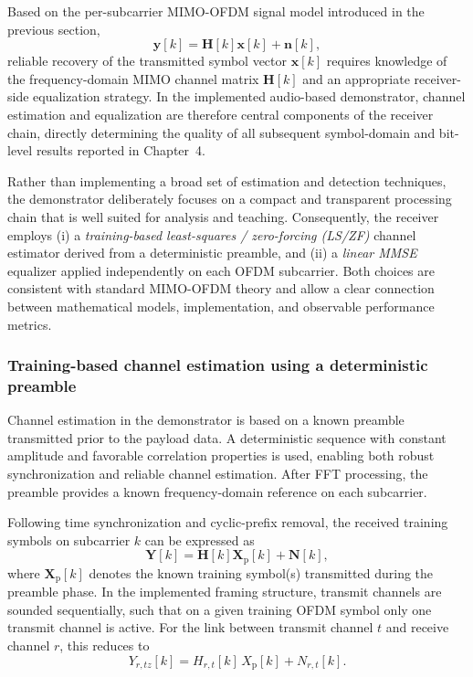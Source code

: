 Based on the per-subcarrier MIMO-OFDM signal model introduced in the previous section,
\begin{equation}
\mathbf{y}[k] = \mathbf{H}[k]\mathbf{x}[k] + \mathbf{n}[k],
\end{equation}
reliable recovery of the transmitted symbol vector $\mathbf{x}[k]$ requires knowledge of the frequency-domain MIMO channel matrix $\mathbf{H}[k]$ and an appropriate receiver-side equalization strategy. In the implemented audio-based demonstrator, channel estimation and equalization are therefore central components of the receiver chain, directly determining the quality of all subsequent symbol-domain and bit-level results reported in Chapter~4.

Rather than implementing a broad set of estimation and detection techniques, the demonstrator deliberately focuses on a compact and transparent processing chain that is well suited for analysis and teaching. Consequently, the receiver employs (i) a \emph{training-based least-squares / zero-forcing (LS/ZF)} channel estimator derived from a deterministic preamble, and (ii) a \emph{linear MMSE} equalizer applied independently on each OFDM subcarrier. Both choices are consistent with standard MIMO-OFDM theory and allow a clear connection between mathematical models, implementation, and observable performance metrics.

\subsubsection{Training-based channel estimation using a deterministic preamble}

Channel estimation in the demonstrator is based on a known preamble transmitted prior to the payload data. A deterministic sequence with constant amplitude and favorable correlation properties is used, enabling both robust synchronization and reliable channel estimation. After FFT processing, the preamble provides a known frequency-domain reference on each subcarrier.

Following time synchronization and cyclic-prefix removal, the received training symbols on subcarrier $k$ can be expressed as
\begin{equation}
\mathbf{Y}[k] = \mathbf{H}[k]\mathbf{X}_{\mathrm{p}}[k] + \mathbf{N}[k],
\end{equation}
where $\mathbf{X}_{\mathrm{p}}[k]$ denotes the known training symbol(s) transmitted during the preamble phase. In the implemented framing structure, transmit channels are sounded sequentially, such that on a given training OFDM symbol only one transmit channel is active. For the link between transmit channel $t$ and receive channel $r$, this reduces to
\begin{equation}
Y_{r,tz  }[k] = H_{r,t}[k]\,X_{\mathrm{p}}[k] + N_{r,t}[k].
\end{equation}

